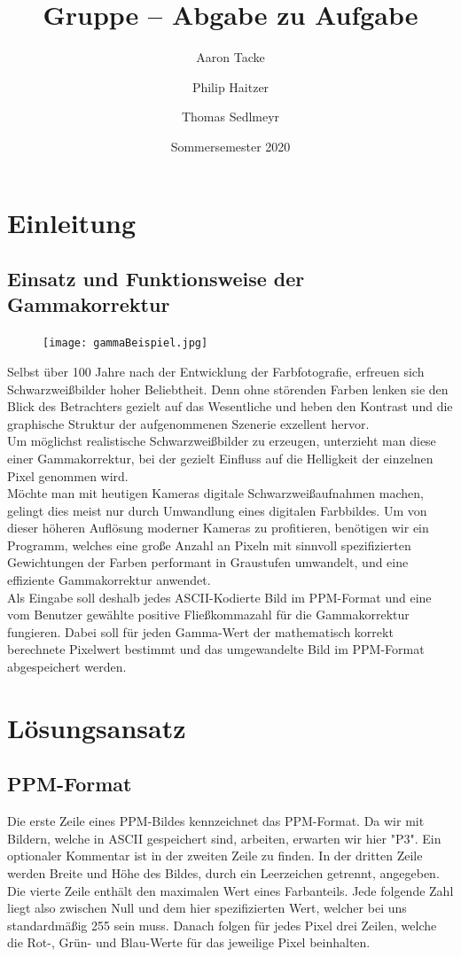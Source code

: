 \documentclass[course=erap]{aspdoc}
\author{Aaron Tacke \and Philip Haitzer \and Thomas Sedlmeyr}
\date{Sommersemester 2020} %
\title{Gruppe \theGroup{} -- Abgabe zu Aufgabe \theNumber}
\begin{document}
	\maketitle
	
	\section{Einleitung}
	\subsection{Einsatz und Funktionsweise der Gammakorrektur}
	
	\begin{figure}
		\texttt{[image: gammaBeispiel.jpg]}
	\end{figure}
	Selbst über 100 Jahre nach der Entwicklung der Farbfotografie, erfreuen sich Schwarzweißbilder hoher Beliebtheit. Denn ohne störenden Farben lenken sie den Blick des Betrachters gezielt auf das Wesentliche und heben den Kontrast und die graphische Struktur der aufgenommenen Szenerie exzellent hervor.\\
	Um möglichst realistische Schwarzweißbilder zu erzeugen, unterzieht man diese einer Gammakorrektur, bei der gezielt Einfluss auf die Helligkeit der einzelnen Pixel genommen wird.\\
	
	\noindent Möchte man mit heutigen Kameras digitale Schwarzweißaufnahmen machen, gelingt dies meist nur durch Umwandlung eines digitalen Farbbildes. Um von dieser höheren Auflösung moderner Kameras zu profitieren, benötigen wir ein Programm, welches eine große Anzahl an Pixeln mit sinnvoll spezifizierten Gewichtungen der Farben performant in Graustufen umwandelt, und eine effiziente Gammakorrektur anwendet.\\
	
	\noindent Als Eingabe soll deshalb jedes ASCII-Kodierte Bild im PPM-Format und eine vom Benutzer gewählte positive Fließkommazahl für die Gammakorrektur fungieren. Dabei soll für jeden Gamma-Wert der mathematisch korrekt berechnete Pixelwert bestimmt und das umgewandelte Bild im PPM-Format abgespeichert werden.
	
	
	\section{Lösungsansatz}
	\subsection{PPM-Format}
	Die erste Zeile eines PPM-Bildes kennzeichnet das PPM-Format. Da wir mit Bildern, welche in ASCII gespeichert sind, arbeiten, erwarten wir hier "P3".
	Ein optionaler Kommentar ist in der zweiten Zeile zu finden.
	In der dritten Zeile werden Breite und Höhe des Bildes, durch ein Leerzeichen getrennt, angegeben.
    Die vierte Zeile enthält den maximalen Wert eines Farbanteils. Jede folgende Zahl liegt also zwischen Null und dem hier spezifizierten Wert, welcher bei uns standardmäßig 255 sein muss.
    Danach folgen für jedes Pixel drei Zeilen, welche die Rot-, Grün- und Blau-Werte für das jeweilige Pixel beinhalten.
	
\end{document}
